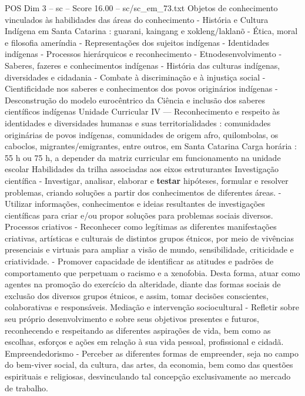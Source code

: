 \begin{textsample}{POS Dim 3 – sc – Score 16.00 – sc/sc\_em\_73.txt}
Objetos de conhecimento vinculados às habilidades das áreas do conhecimento - História e Cultura Indígena em Santa Catarina : guarani, kaingang e xokleng/laklanõ - Ética, moral e filosofia ameríndia - Representações dos sujeitos indígenas - Identidades indígenas - Processos hierárquicos e reconhecimento - Etnodesenvolvimento - Saberes, fazeres e conhecimentos indígenas - História das culturas indígenas, diversidades e cidadania - Combate à discriminação e à injustiça social - Cientificidade nos saberes e conhecimentos dos povos originários indígenas - Desconstrução do modelo eurocêntrico da Ciência e inclusão dos saberes científicos indígenas Unidade Curricular IV — Reconhecimento e respeito às identidades e diversidades humanas e suas territorialidades : comunidades originárias de povos indígenas, comunidades de origem afro, quilombolas, os caboclos, migrantes/emigrantes, entre outros, em Santa Catarina Carga horária : 55 h ou 75 h, a depender da matriz curricular em funcionamento na unidade escolar Habilidades da trilha associadas aos eixos estruturantes Investigação científica - Investigar, analisar, elaborar e \textbf{testar} hipóteses, formular e resolver problemas, criando soluções a partir dos conhecimentos de diferentes áreas. - Utilizar informações, conhecimentos e ideias resultantes de investigações científicas para criar e/ou propor soluções para problemas sociais diversos.
Processos criativos - Reconhecer como legítimas as diferentes manifestações criativas, artísticas e culturais de distintos grupos étnicos, por meio de vivências presenciais e virtuais para ampliar a visão de mundo, sensibilidade, criticidade e criatividade. - Promover capacidade de identificar as atitudes e padrões de comportamento que perpetuam o racismo e a xenofobia.
Desta forma, atuar como agentes na promoção do exercício da alteridade, diante das formas sociais de exclusão dos diversos grupos étnicos, e assim, tomar decisões conscientes, colaborativas e responsáveis.
Mediação e intervenção sociocultural - Refletir sobre seu próprio desenvolvimento e sobre seus objetivos presentes e futuros, reconhecendo e respeitando as diferentes aspirações de vida, bem como as escolhas, esforços e ações em relação à sua vida pessoal, profissional e cidadã.
Empreendedorismo - Perceber as diferentes formas de empreender, seja no campo do bem-viver social, da cultura, das artes, da economia, bem como das questões espirituais e religiosas, desvinculando tal concepção exclusivamente ao mercado de trabalho.

\end{textsample}
